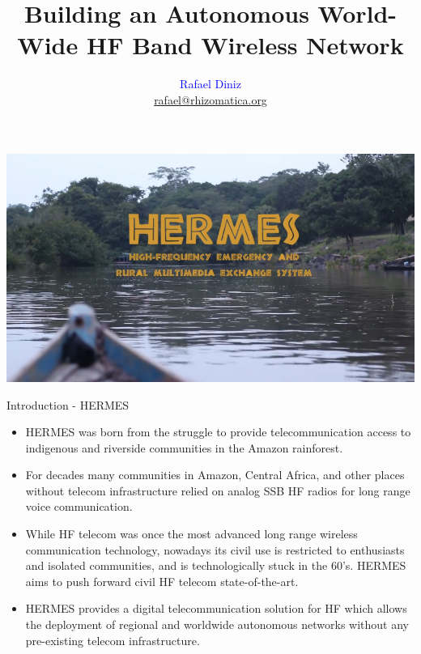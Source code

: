 \documentclass[aspectratio=169,xcolor={x11names,svgnames,dvipsnames}]{beamer}
\author[Rafael Diniz]{\texorpdfstring{\textcolor{blue}{Rafael Diniz} \\
\url{rafael@rhizomatica.org}}{Rafael Diniz}}
\title{Building an Autonomous World-Wide HF Band Wireless Network}
\subtitle{
\texorpdfstring{ %
\hrulefill\ \adforn{57}\thickspace\wb{.}\thickspace\adforn{29}\ \hrulefill}
}
\date[2024]{}
\begin{document}
\begin{frame}[plain]
\maketitle
\end{frame}


\begin{frame}
\begin{center}
  \includegraphics[width=.9\columnwidth]{hermes.png}
\end{center}
\end{frame}


\begin{frame}{Introduction - HERMES}

  \begin{itemize}
  \item HERMES was born from the struggle to provide
  telecommunication access to indigenous and riverside
  communities in the Amazon rainforest.

  \item For decades many communities in Amazon, Central Africa, and other
  places without telecom infrastructure relied on analog SSB HF radios
  for long range voice communication.

  \item While HF telecom was once the most advanced long range
  wireless communication technology, nowadays its civil use is
  restricted to enthusiasts and isolated communities, and is
  technologically stuck in the 60's. HERMES aims to push forward
  civil HF telecom state-of-the-art.

  \item HERMES provides a digital telecommunication solution for HF
  which allows the deployment of regional and worldwide autonomous
  networks without any pre-existing telecom infrastructure.

  \end{itemize}

\end{frame}
\end{document}
